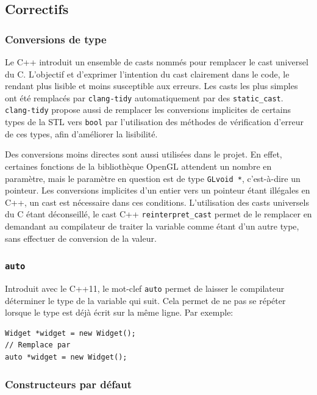 \subsection{Correctifs}

\subsubsection{Conversions de type}\label{conversions-de-type}

Le C++ introduit un ensemble de casts nommés pour remplacer le cast
universel du C. L'objectif et d'exprimer l'intention du cast clairement
dans le code, le rendant plus lisible et moins susceptible aux erreurs.
Les casts les plus simples ont été remplacés par \texttt{clang-tidy}
automatiquement par des \texttt{static\_cast}. \texttt{clang-tidy}
propose aussi de remplacer les conversions implicites de certains types
de la STL vers \texttt{bool} par l'utilisation des méthodes de
vérification d'erreur de ces types, afin d'améliorer la lisibilité.

Des conversions moins directes sont aussi utilisées dans le projet. En
effet, certaines fonctions de la bibliothèque OpenGL attendent un nombre
en paramètre, mais le paramètre en question est de type
\texttt{GLvoid\ *}, c'est-à-dire un pointeur. Les conversions implicites
d'un entier vers un pointeur étant illégales en C++, un cast est
nécessaire dans ces conditions. L'utilisation des casts universels du C
étant déconseillé, le cast C++ \texttt{reinterpret\_cast} permet de le
remplacer en demandant au compilateur de traiter la variable comme étant
d'un autre type, sans effectuer de conversion de la valeur.

\subsubsection{\texorpdfstring{\texttt{auto}}{auto}}

Introduit avec le C++11, le mot-clef \texttt{auto} permet de laisser le
compilateur déterminer le type de la variable qui suit. Cela permet de
ne pas se répéter lorsque le type est déjà écrit sur la même ligne. Par
exemple:

\lstset{language=C++}
\begin{lstlisting}
Widget *widget = new Widget();
// Remplace par
auto *widget = new Widget();
\end{lstlisting}

\subsubsection{Constructeurs par défaut}

